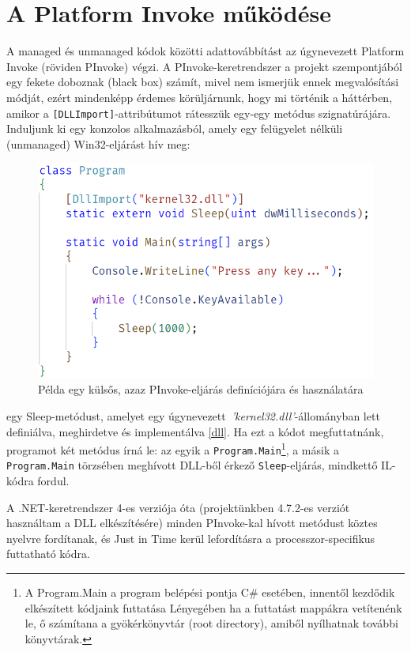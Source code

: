 \documentclass[tocnopagenum]{thesis-ekf}
\theoremstyle{definition}
\theoremstyle{remark}
\begin{document}
	\section{A Platform Invoke működése}
	A managed és unmanaged kódok közötti adattovábbítást az úgynevezett Platform Invoke (röviden PInvoke) végzi. A PInvoke-keretrendszer a projekt szempontjából egy fekete doboznak (black box) számít, mivel nem ismerjük ennek megvalósítási módját, ezért mindenképp érdemes körüljárnunk, hogy mi történik a háttérben, amikor a \verb*|[DLLImport]|-attribútumot rátesszük egy-egy metódus szignatúrájára.
	Induljunk ki egy konzolos alkalmazásból, amely egy felügyelet nélküli (unmanaged) Win32-eljárást hív meg:
	\begin{figure}[h!]
		\centering
		\includegraphics[scale=0.85]{pinvoke_example}
		\caption{Példa egy külsős, azaz PInvoke-eljárás definíciójára és használatára}
		\label{fig_pinvoke_example}
	\end{figure} egy Sleep-metódust, amelyet egy úgynevezett \,\textit{'kernel32.dll'}-állományban lett definiálva, meghirdetve és implementálva \ref{dll}. Ha ezt a kódot megfuttatnánk, programot két metódus írná le: az egyik a \verb*|Program.Main|\footnote{A Program.Main a program belépési pontja C\# esetében, innentől kezdődik elkészített kódjaink futtatása Lényegében ha a futtatást mappákra vetítenénk le, ő számítana a gyökérkönyvtár (root directory), amiből nyílhatnak további könyvtárak.}, a másik a \verb*|Program.Main| törzsében meghívott DLL-ből érkező \verb*|Sleep|-eljárás, mindkettő IL-kódra fordul.
	
	A .NET-keretrendszer 4-es verziója óta (projektünkben 4.7.2-es verziót használtam a DLL elkészítésére) minden PInvoke-kal hívott metódust köztes nyelvre fordítanak, és Just in Time kerül lefordításra a processzor-specifikus futtatható kódra.
	
\end{document}
